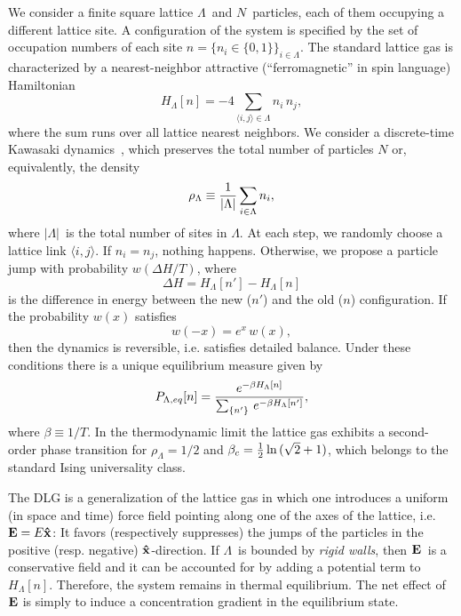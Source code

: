 \documentclass[12pt]{article}
\begin{document}
We consider a finite square lattice $\Lambda$\ 
and $N$\ particles, each of them occupying a different lattice site. A
configuration of the system is specified by the set of
occupation numbers of each site 
$ n = \{n_{i} \in \{0,1\}\}_{i\in\Lambda}.  $
The standard lattice gas is characterized by 
a nearest-neighbor attractive (``ferromagnetic'' in spin language)
Hamiltonian 
\begin{equation}
        H_{\Lambda}[n]=-4\sum_{\langle i,j \rangle\in\Lambda} n_{i}\,n_{j},
\end{equation} 
where the sum runs over all lattice nearest neighbors.
We consider a  discrete-time Kawasaki dynamics~\cite{Kawasaki},
which preserves the total number of particles $N$ or, 
equivalently, the density 
\begin{equation}
        \rho_{\Lambda} \equiv  \frac{1}{|\Lambda|}\sum_{i\in\Lambda} n_{i},
\end{equation}
where $|\Lambda|$\ is the total number of sites in $\Lambda$.
At each step, we randomly choose a lattice link $\langle i,j \rangle$. 
If $n_i = n_j$, nothing happens. Otherwise, we propose 
a particle jump with probability $w(\Delta H/T)$, where 
\begin{equation}
        \Delta H = H_\Lambda[n'] - H_\Lambda[n]
\end{equation}
is the difference in energy between the new ($n'$) and the old ($n$) 
configuration. If the probability $w(x)$ satisfies
\begin{equation}
        w(-x)=e^{x}\,w(x),
\end{equation} 
then the dynamics is reversible, i.e. satisfies detailed balance.
Under these conditions there is a unique equilibrium measure
given by 
\begin{equation}
        P_{\Lambda,eq}[n]=\frac{e^{-\beta
        H_\Lambda[n]}}{\sum_{\{n'\}}\,e^{-\beta H_\Lambda[n']}} ,
\end{equation} 
where $\beta \equiv 1/T$.
In the thermodynamic limit
the lattice gas exhibits a second-order phase transition 
for $\rho_\Lambda = 1/2$ and \mbox{$\beta_{c}=\frac{1}{2}\ln{ (\sqrt{2}+1)}$}, 
which belongs to the standard Ising universality class.

The DLG is a generalization of the lattice gas in which one 
introduces a uniform (in space and time) force field
pointing along one of the axes of the lattice, i.e. ${\bf E}=E{\bf \hat{x}}$:
It favors (respectively suppresses) the jumps of the particles in the 
positive (resp. negative) ${\bf \hat{x}}$-direction.
If $\Lambda$\ is
bounded by {\it rigid walls}, then ${\bf E}$\ is a conservative field and 
it can be accounted for by adding a potential term
to $H_\Lambda[n]$. Therefore, the system remains in thermal equilibrium.
The net effect of ${\bf E}$ is simply to induce a concentration gradient in the
equilibrium state. 
\end{document}
